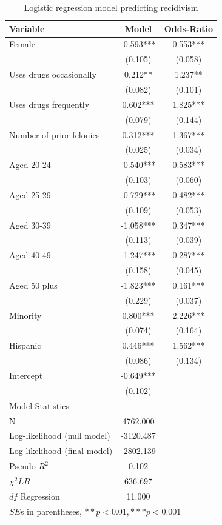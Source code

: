\begin{table}[htbp]\centering
 \caption{Logistic regression model predicting recidivism \label{tab:recdlogit}}
\begin{tabular}{lcc}
\hline
Variable      &    Model & Odds-Ratio  \\
\hline
Female   &   -0.593***&    0.553***\\
      &   (0.105)  &   (0.058)  \\
Uses drugs occasionally   &    0.212** &    1.237** \\
      &   (0.082)  &   (0.101)  \\
Uses drugs frequently   &    0.602***&    1.825***\\
      &   (0.079)  &   (0.144)  \\
Number of prior felonies    &    0.312***&    1.367***\\
      &   (0.025)  &   (0.034)  \\
Aged 20-24   &   -0.540***&    0.583***\\
      &   (0.103)  &   (0.060)  \\
Aged 25-29   &   -0.729***&    0.482***\\
      &   (0.109)  &   (0.053)  \\
Aged 30-39   &   -1.058***&    0.347***\\
      &   (0.113)  &   (0.039)  \\
Aged 40-49   &   -1.247***&    0.287***\\
      &   (0.158)  &   (0.045)  \\
Aged 50 plus   &   -1.823***&    0.161***\\
      &   (0.229)  &   (0.037)  \\
Minority    &    0.800***&    2.226***\\
      &   (0.074)  &   (0.164)  \\
Hispanic     &    0.446***&    1.562***\\
      &   (0.086)  &   (0.134)  \\
Intercept   &   -0.649***\\
      &   (0.102)  &    \\
\hline
\multicolumn{1}{l}{Model Statistics} \\
\hline
N      &   4762.000  \\
Log-likelihood (null model)    &  -3120.487  \\
Log-likelihood (final model)     &  -2802.139  \\
Pseudo-$R^2$    &    0.102  \\
$\chi^2 LR$    &   636.697  \\
$df$ Regression    &    11.000  \\
\hline
\multicolumn{3}{l}{$SE$s in parentheses, $**p<0.01, ***p<0.001$} \\
\hline
\end{tabular}
\end{table}

